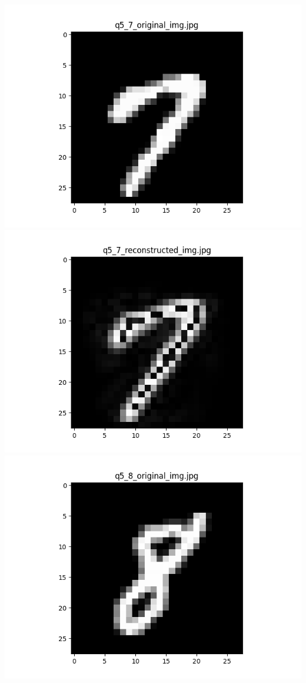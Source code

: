 \documentclass{article}
\begin{document}
    \\
    \includegraphics[scale=.6]{../results/q5/original/q5_7_original.png}
    \includegraphics[scale=.6]{../results/q5/reconstrcuted/q5_7_reconstructed.png}
    \\
    \includegraphics[scale=.6]{../results/q5/original/q5_8_original.png}
\end{document}
